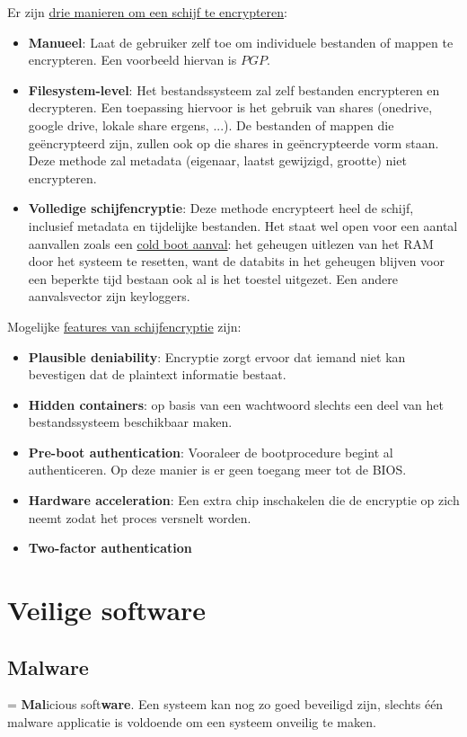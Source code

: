 \documentclass{report}
\begin{document}
	Er zijn \underline{drie manieren om een schijf te encrypteren}:
	\begin{itemize}
		\item \textbf{Manueel}: Laat de gebruiker zelf toe om individuele bestanden of mappen te encrypteren. Een voorbeeld hiervan is $PGP$.
		\item \textbf{Filesystem-level}: Het bestandssysteem zal zelf bestanden encrypteren en decrypteren. Een toepassing hiervoor is het gebruik van shares (onedrive, google drive, lokale share ergens, ...). De bestanden of mappen die geëncrypteerd zijn, zullen ook op die shares in geëncrypteerde vorm staan. Deze methode zal metadata (eigenaar, laatst gewijzigd, grootte) niet encrypteren.
		\item \textbf{Volledige schijfencryptie}: Deze methode encrypteert heel de schijf, inclusief metadata en tijdelijke bestanden. Het staat wel open voor een aantal aanvallen zoals een \underline{cold boot aanval}: het geheugen uitlezen van het RAM door het systeem te resetten, want de databits in het geheugen blijven voor een beperkte tijd bestaan ook al is het toestel uitgezet. Een andere aanvalsvector zijn keyloggers.
	\end{itemize}
	Mogelijke \underline{features van schijfencryptie} zijn:
	\begin{itemize}
		\item \textbf{Plausible deniability}: Encryptie zorgt ervoor dat iemand niet kan bevestigen dat de plaintext informatie bestaat.
		\item \textbf{Hidden containers}: op basis van een wachtwoord slechts een deel van het bestandssysteem beschikbaar maken.
		\item \textbf{Pre-boot authentication}: Vooraleer de bootprocedure begint al authenticeren. Op deze manier is er geen toegang meer tot de BIOS.
		\item \textbf{Hardware acceleration}: Een extra chip inschakelen die de encryptie op zich neemt zodat het proces versnelt worden.
		\item \textbf{Two-factor authentication}
	\end{itemize}


	\section{Veilige software}
	\subsection{Malware}
	= \textbf{Mal}icious soft\textbf{ware}. Een systeem kan nog zo goed beveiligd zijn, slechts één malware applicatie is voldoende om een systeem onveilig te maken.
\end{document}
